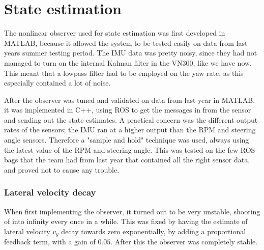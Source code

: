 \section{State estimation}

The nonlinear observer used for state estimation was first developed in MATLAB, because it allowed the system to be tested easily on data from last years summer testing period. The \gls{IMU} data was pretty noisy, since they had not managed to turn on the internal Kalman filter in the VN300, like we have now. This meant that a lowpass filter had to be employed on the yaw rate, as this especially contained a lot of noise. 

After the observer was tuned and validated on data from last year in MATLAB, it was implemented in C++, using \gls{ROS} to get the messages in from the sensor and sending out the state estimates. A practical concern was the different output rates of the sensors; the \gls{IMU} ran at a higher output than the \gls{RPM} and steering angle sensors. Therefore a "sample and hold" technique was used, always using the latest value of the \gls{RPM} and steering angle. This was tested on the few \gls{ROS}-bags that the team had from last year that contained all the right sensor data, and proved not to cause any trouble.  

\subsubsection{Lateral velocity decay}

When first implementing the observer, it turned out to be very unstable, shooting of into infinity every once in a while. This was fixed by having the estimate of lateral velocity $v_y$ decay towards zero exponentially, by adding a proportional feedback term, with a gain of $0.05$. After this the observer was completely stable.